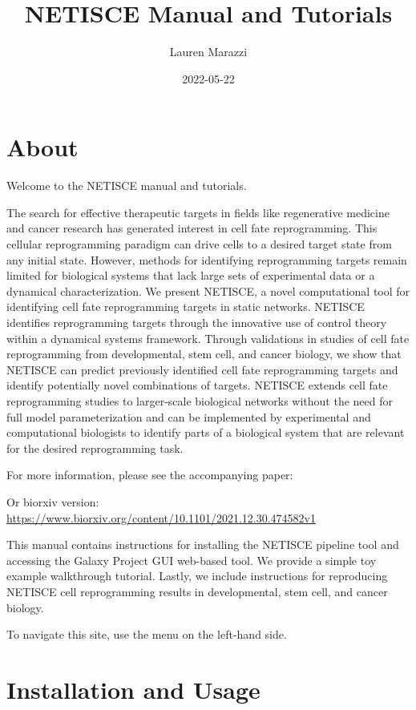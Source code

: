 \documentclass[
]{book}
\title{NETISCE Manual and Tutorials}
\author{Lauren Marazzi}
\date{2022-05-22}
\begin{document}
\maketitle

{
\setcounter{tocdepth}{1}
\tableofcontents
}
\hypertarget{about}{%
\chapter{About}\label{about}}

Welcome to the NETISCE manual and tutorials.

The search for effective therapeutic targets in fields like regenerative medicine and cancer research has generated interest in cell fate reprogramming. This cellular reprogramming paradigm can drive cells to a desired target state from any initial state. However, methods for identifying reprogramming targets remain limited for biological systems that lack large sets of experimental data or a dynamical characterization. We present NETISCE, a novel computational tool for identifying cell fate reprogramming targets in static networks. NETISCE identifies reprogramming targets through the innovative use of control theory within a dynamical systems framework. Through validations in studies of cell fate reprogramming from developmental, stem cell, and cancer biology, we show that NETISCE can predict previously identified cell fate reprogramming targets and identify potentially novel combinations of targets. NETISCE extends cell fate reprogramming studies to larger-scale biological networks without the need for full model parameterization and can be implemented by experimental and computational biologists to identify parts of a biological system that are relevant for the desired reprogramming task.

For more information, please see the accompanying paper:

Or biorxiv version: \url{https://www.biorxiv.org/content/10.1101/2021.12.30.474582v1}

This manual contains instructions for installing the NETISCE pipeline tool and accessing the Galaxy Project GUI web-based tool. We provide a simple toy example walkthrough tutorial. Lastly, we include instructions for reproducing NETISCE cell reprogramming results in developmental, stem cell, and cancer biology.

To navigate this site, use the menu on the left-hand side.

\hypertarget{installation-and-usage}{%
\chapter{Installation and Usage}\label{installation-and-usage}}
\end{document}
